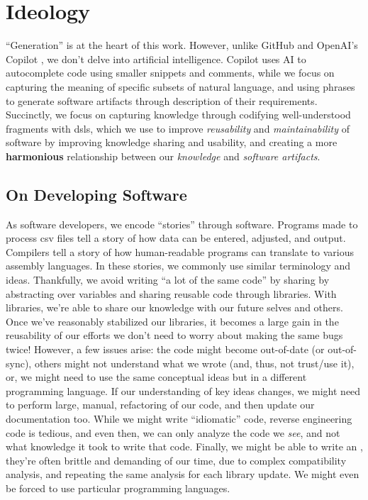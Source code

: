 \chapter[Ideology]{Ideology\footnotemark}
\label{chap:ideology}

``Generation'' is at the heart of this work. However, unlike GitHub and OpenAI's
Copilot \cite{Copilot}, we don't delve into artificial intelligence. Copilot
uses AI to autocomplete code using smaller snippets and comments, while we focus
on capturing the meaning of specific subsets of natural language, and using
phrases to generate software artifacts through description of their
requirements. Succinctly, we focus on capturing knowledge through codifying
well-understood fragments with \aclp{dsl}, which we use to improve
\textit{reusability} and \textit{maintainability} of software by improving
knowledge sharing and usability, and creating a more \textbf{harmonious}
relationship between our \textit{knowledge} and \textit{software artifacts}.

\section{On Developing Software}
\label{chap:ideology:sec:on_developing_software}

As software developers, we encode ``stories'' through software. Programs made to
process \acs{csv} files tell a story of how data can be entered, adjusted, and
output. Compilers tell a story of how human-readable programs can translate to
various assembly languages. In these stories, we commonly use similar
terminology and ideas. Thankfully, we avoid writing ``a lot of the same code''
by sharing by abstracting over variables and sharing reusable code through
libraries. With libraries, we're able to share our knowledge with our future
selves and others. Once we've reasonably stabilized our libraries, it becomes a
large gain in the reusability of our efforts \textemdash we don't need to worry
about making the same bugs twice! However, a few issues arise: the code might
become out-of-date (or out-of-sync), others might not understand what we wrote
(and, thus, not trust/use it), or, we might need to use the same conceptual
ideas but in a different programming language. If our understanding of key ideas
changes, we might need to perform large, manual, refactoring of our code, and
then update our documentation too. While we might write ``idiomatic'' code,
reverse engineering code is tedious, and even then, we can only analyze the code
we \textit{see}, and not what knowledge it took to write that code. Finally, we
might be able to write an , they're often brittle and demanding of our
time, due to complex compatibility analysis, and repeating the same analysis for
each library update. We might even be forced to use particular programming
languages.

